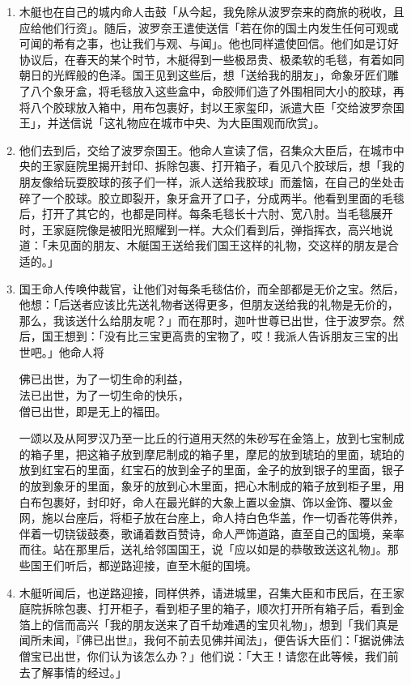 \begin{enumerate}
\item 木艇也在自己的城内命人击鼓「从今起，我免除从波罗奈来的商旅的税收，且应给他们行资」。随后，波罗奈王遣使送信「若在你的国土内发生任何可观或可闻的希有之事，也让我们与观、与闻」。他也同样遣使回信。他们如是订好协议后，在春天的某个时节，木艇得到一些极昂贵、极柔软的毛毯，有着如同朝日的光辉般的色泽。国王见到这些后，想「送给我的朋友」，命象牙匠们雕了八个象牙盒，将毛毯放入这些盒中，命胶师们造了外围相同大小的胶球，再将八个胶球放入箱中，用布包裹好，封以王家玺印，派遣大臣「交给波罗奈国王」，并送信说「这礼物应在城市中央、为大臣围观而欣赏」。
\item 他们去到后，交给了波罗奈国王。他命人宣读了信，召集众大臣后，在城市中央的王家庭院里揭开封印、拆除包裹、打开箱子，看见八个胶球后，想「我的朋友像给玩耍胶球的孩子们一样，派人送给我胶球」而羞恼，在自己的坐处击碎了一个胶球。胶立即裂开，象牙盒开了口子，分成两半。他看到里面的毛毯后，打开了其它的，也都是同样。每条毛毯长十六肘、宽八肘。当毛毯展开时，王家庭院像是被阳光照耀到一样。大众们看到后，弹指挥衣，高兴地说道：「未见面的朋友、木艇国王送给我们国王这样的礼物，交这样的朋友是合适的。」
\item 国王命人传唤仲裁官，让他们对每条毛毯估价，而全部都是无价之宝。然后，他想：「后送者应该比先送礼物者送得更多，但朋友送给我的礼物是无价的，那么，我该送什么给朋友呢？」而在那时，迦叶世尊已出世，住于波罗奈。然后，国王想到：「没有比三宝更高贵的宝物了，哎！我派人告诉朋友三宝的出世吧。」他命人将\begin{quoting}佛已出世，为了一切生命的利益，\\法已出世，为了一切生命的快乐，\\僧已出世，即是无上的福田。\end{quoting}一颂以及从阿罗汉乃至一比丘的行道用天然的朱砂写在金箔上，放到七宝制成的箱子里，把这箱子放到摩尼制成的箱子里，摩尼的放到琥珀的里面，琥珀的放到红宝石的里面，红宝石的放到金子的里面，金子的放到银子的里面，银子的放到象牙的里面，象牙的放到心木里面，把心木制成的箱子放到柜子里，用白布包裹好，封印好，命人在最光鲜的大象上置以金旗、饰以金饰、覆以金网，施以台座后，将柜子放在台座上，命人持白色华盖，作一切香花等供养，伴着一切铙钹鼓奏，歌诵着数百赞诗，命人严饰道路，直至自己的国境，亲率而往。站在那里后，送礼给邻国国王，说「应以如是的恭敬致送这礼物」。那些国王们听后，都逆路迎接，直至木艇的国境。
\item 木艇听闻后，也逆路迎接，同样供养，请进城里，召集大臣和市民后，在王家庭院拆除包裹、打开柜子，看到柜子里的箱子，顺次打开所有箱子后，看到金箔上的信而高兴「我的朋友送来了百千劫难遇的宝贝礼物」，想到「我们真是闻所未闻，『佛已出世』，我何不前去见佛并闻法」，便告诉大臣们：「据说佛法僧宝已出世，你们认为该怎么办？」他们说：「大王！请您在此等候，我们前去了解事情的经过。」

\end{enumerate}
